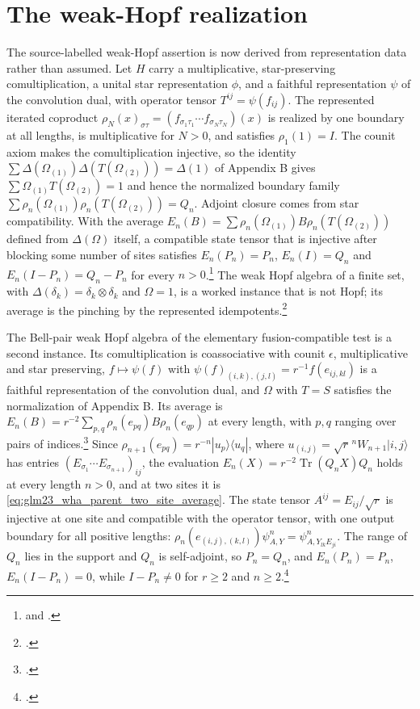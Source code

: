 \documentclass{article}
\begin{document}
\section{The weak-Hopf realization}
The source-labelled weak-Hopf assertion is now derived from representation
data rather than assumed. Let $H$ carry a multiplicative, star-preserving
comultiplication, a unital star representation $\phi$, and a faithful
representation $\psi$ of the convolution dual, with operator tensor
$T^{ij}=\psi(f_{ij})$. The represented iterated coproduct
$\rho_N(x)_{\sigma\tau}=(f_{\sigma_1\tau_1}\cdots f_{\sigma_N\tau_N})(x)$
is realized by one boundary at all lengths, is multiplicative for $N>0$,
and satisfies $\rho_1(1)=I$. The counit axiom makes the comultiplication
injective, so the identity
$\sum\Delta(\Omega_{(1)})\Delta(T(\Omega_{(2)}))=\Delta(1)$ of Appendix B
gives $\sum\Omega_{(1)}T(\Omega_{(2)})=1$ and hence the normalized boundary
family $\sum\rho_n(\Omega_{(1)})\rho_n(T(\Omega_{(2)}))=Q_n$. Adjoint
closure comes from star compatibility. With the average
$E_n(B)=\sum\rho_n(\Omega_{(1)})B\rho_n(T(\Omega_{(2)}))$ defined from
$\Delta(\Omega)$ itself, a compatible state tensor that is injective after
blocking some number of sites satisfies $E_n(P_n)=P_n$, $E_n(I)=Q_n$ and
$E_n(I-P_n)=Q_n-P_n$ for every $n>0$.\footnote{
     and
    .}
The weak Hopf algebra of a finite set, with
$\Delta(\delta_k)=\delta_k\otimes\delta_k$ and $\Omega=1$, is a worked
instance that is not Hopf; its average is the pinching by the represented
idempotents.\footnote{.}

The Bell-pair weak Hopf algebra of the elementary fusion-compatible test
is a second instance. Its comultiplication is coassociative with counit $\epsilon$,
multiplicative and star preserving, $f\mapsto\psi(f)$ with
$\psi(f)_{(i,k),(j,l)}=r^{-1}f(e_{ij,kl})$ is a faithful representation of the
convolution dual, and $\Omega$ with $T=S$ satisfies the normalization of
Appendix B. Its average is
$E_n(B)=r^{-2}\sum_{p,q}\rho_n(e_{pq})B\rho_n(e_{qp})$ at every length, with
$p,q$ ranging over pairs of indices.\footnote{
    .}
Since $\rho_{n+1}(e_{pq})=r^{-n}|u_p\rangle\langle u_q|$, where
$u_{(i,j)}=\sqrt r^{\,n}W_{n+1}|i,j\rangle$ has entries
$(E_{\sigma_1}\cdots E_{\sigma_{n+1}})_{ij}$, the evaluation
$E_n(X)=r^{-2}\operatorname{Tr}(Q_nX)Q_n$ holds at every length $n>0$, and
at two sites it is \eqref{eq:glm23_wha_parent_two_site_average}. The
state tensor $A^{ij}=E_{ij}/\sqrt r$ is injective at one site and
compatible with the operator tensor, with one output boundary for all
positive lengths:
$\rho_n(e_{(i,j),(k,l)})\psi^n_{A,Y}=\psi^n_{A,Y_{lk}E_{ji}}$. The range of
$Q_n$ lies in the support and $Q_n$ is self-adjoint, so $P_n=Q_n$, and
$E_n(P_n)=P_n$, $E_n(I-P_n)=0$, while $I-P_n\ne0$ for $r\ge2$ and
$n\ge2$.\footnote{.}
\end{document}
